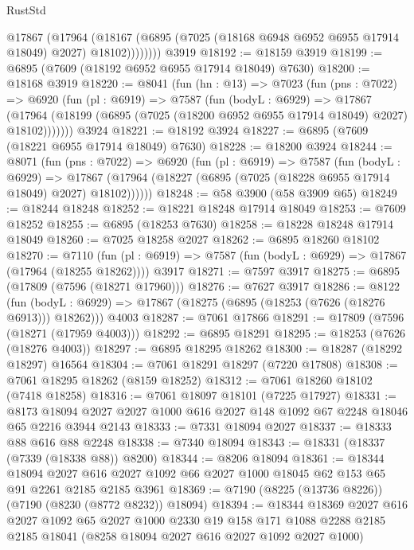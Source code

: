 \begin{lexlean}{RustStd}
\begin{coremodule}
            @17867
              (@17964
                (@18167 (@6895 (@7025 (@18168 @6948 @6952 @6955 @17914 @18049) @2027) @18102))))))))
    @3919
@18192 := @18159 @3919
@18199 := @6895 (@7609 (@18192 @6952 @6955 @17914 @18049) @7630)
@18200 := @18168 @3919
@18220 := @8041
    (fun (hn : @13) =>
    @7023
      (fun (pns : @7022) =>
      @6920
        (fun (pl : @6919) =>
        @7587
          (fun (bodyL : @6929) =>
          @17867
            (@17964 (@18199 (@6895 (@7025 (@18200 @6952 @6955 @17914 @18049) @2027) @18102)))))))
    @3924
@18221 := @18192 @3924
@18227 := @6895 (@7609 (@18221 @6955 @17914 @18049) @7630)
@18228 := @18200 @3924
@18244 := @8071
    (fun (pns : @7022) =>
    @6920
      (fun (pl : @6919) =>
      @7587
        (fun (bodyL : @6929) =>
        @17867 (@17964 (@18227 (@6895 (@7025 (@18228 @6955 @17914 @18049) @2027) @18102))))))
@18248 := @58 @3900 (@58 @3909 @65)
@18249 := @18244 @18248
@18252 := @18221 @18248 @17914 @18049
@18253 := @7609 @18252
@18255 := @6895 (@18253 @7630)
@18258 := @18228 @18248 @17914 @18049
@18260 := @7025 @18258 @2027
@18262 := @6895 @18260 @18102
@18270 := @7110
    (fun (pl : @6919) => @7587 (fun (bodyL : @6929) => @17867 (@17964 (@18255 @18262))))
    @3917
@18271 := @7597 @3917
@18275 := @6895 (@17809 (@7596 (@18271 @17960)))
@18276 := @7627 @3917
@18286 := @8122
    (fun (bodyL : @6929) => @17867 (@18275 (@6895 (@18253 (@7626 (@18276 @6913))) @18262)))
    @4003
@18287 := @7061 @17866
@18291 := @17809 (@7596 (@18271 (@17959 @4003)))
@18292 := @6895 @18291
@18295 := @18253 (@7626 (@18276 @4003))
@18297 := @6895 @18295 @18262
@18300 := @18287 (@18292 @18297) @16564
@18304 := @7061 @18291 @18297 (@7220 @17808)
@18308 := @7061 @18295 @18262 (@8159 @18252)
@18312 := @7061 @18260 @18102 (@7418 @18258)
@18316 := @7061 @18097 @18101 (@7225 @17927)
@18331 := @8173
    @18094
    @2027
    @2027
    @1000
    @616
    @2027
    @148
    @1092
    @67
    @2248
    @18046
    @65
    @2216
    @3944
    @2143
@18333 := @7331 @18094 @2027
@18337 := @18333 @88 @616 @88 @2248
@18338 := @7340 @18094
@18343 := @18331 (@18337 (@7339 (@18338 @88)) @8200)
@18344 := @8206 @18094
@18361 := @18344
    @18094
    @2027
    @616
    @2027
    @1092
    @66
    @2027
    @1000
    @18045
    @62
    @153
    @65
    @91
    @2261
    @2185
    @2185
    @3961
@18369 := @7190 (@8225 (@13736 @8226)) (@7190 (@8230 (@8772 @8232)) @18094)
@18394 := @18344
    @18369
    @2027
    @616
    @2027
    @1092
    @65
    @2027
    @1000
    @2330
    @19
    @158
    @171
    @1088
    @2288
    @2185
    @2185
    @18041
    (@8258 @18094 @2027 @616 @2027 @1092 @2027 @1000)

\end{coremodule}
\end{lexlean}
